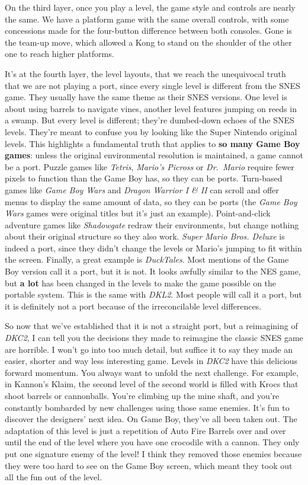 \documentclass{book}
\begin{document}
On the third layer, once you play a level, the game style and controls are nearly the same. We have a platform game with the same overall controls, with some concessions made for the four-button difference between both consoles. Gone is the team-up move, which allowed a Kong to stand on the shoulder of the other one to reach higher platforms.

It’s at the fourth layer, the level layouts, that we reach the unequivocal truth that we are not playing a port, since every single level is different from the SNES game. They usually have the same theme as their SNES versions. One level is about using barrels to navigate vines, another level features jumping on reeds in a swamp. But every level is different; they’re dumbed-down echoes of the SNES levels. They’re meant to confuse you by looking like the Super Nintendo original levels. This highlights a fundamental truth that applies to \textbf{so many Game Boy games}: unless the original environmental resolution is maintained, a game cannot be a port. Puzzle games like \emph{Tetris}, \emph{Mario’s Picross} or \emph{Dr. Mario} require fewer pixels to function than the Game Boy has, so they can be ports. Turn-based games like \emph{Game Boy Wars} and \emph{Dragon Warrior I \& II} can scroll and offer menus to display the same amount of data, so they can be ports (the \emph{Game Boy Wars} games were original titles but it’s just an example). Point-and-click adventure games like \emph{Shadowgate} redraw their environments, but change nothing about their original structure so they also work. \emph{Super Mario Bros. Deluxe} is indeed a port, since they didn’t change the levels or Mario’s jumping to fit within the screen. Finally, a great example is \emph{DuckTales}. Most mentions of the Game Boy version call it a port, but it is not. It looks awfully similar to the NES game, but \textbf{a lot} has been changed in the levels to make the game possible on the portable system. This is the same with \emph{DKL2}. Most people will call it a port, but it is definitely not a port because of the irreconcilable level differences.

So now that we’ve established that it is not a straight port, but a reimagining of \emph{DKC2}, I can tell you the decisions they made to reimagine the classic SNES game are horrible. I won’t go into too much detail, but suffice it to say they made an easier, shorter and way less interesting game. Levels in \emph{DKC2} have this delicious forward momentum. You always want to unfold the next challenge. For example, in Kannon’s Klaim, the second level of the second world is filled with Krocs that shoot barrels or cannonballs. You’re climbing up the mine shaft, and you’re constantly bombarded by new challenges using those same enemies. It’s fun to discover the designers’ next idea. On Game Boy, they’ve all been taken out. The adaptation of this level is just a repetition of Auto Fire Barrels over and over until the end of the level where you have one crocodile with a cannon. They only put one signature enemy of the level! I think they removed those enemies because they were too hard to see on the Game Boy screen, which meant they took out all the fun out of the level.
\end{document}
